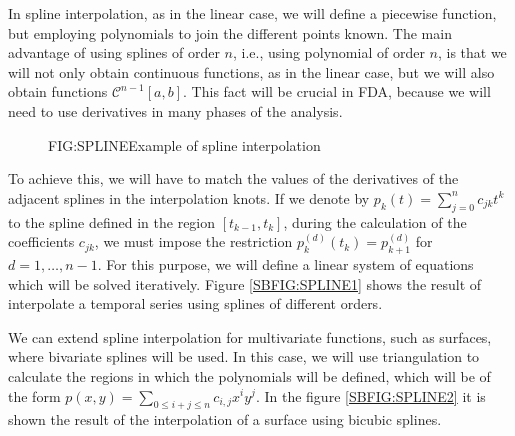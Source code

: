 
In spline interpolation, as in the linear case, we will define a piecewise
function, but employing polynomials to join the different points known.
The main advantage of using splines of order $n$, i.e., using polynomial of
order $n$, is that we will not only obtain continuous functions, as in the
linear case, but we will also obtain functions $\mathcal{C}^{n-1}[a,b]$.
This fact will be crucial in FDA, because we will need to use derivatives in
many phases of the analysis.

\begin{figure}[Example of spline interpolation]{FIG:SPLINE}{Example of spline interpolation}
	 \quad
\end{figure}

To achieve this, we will have to match the values of the derivatives of the
adjacent splines in the interpolation knots. If we denote by
$p_k(t)=\sum_{j=0}^n c_{jk} t^k$ to the spline defined in the region
$[t_{k-1}, t_{k}]$, during the calculation of the coefficients $c_{jk}$, we must
impose the restriction $p_{k}^{(d)}(t_k) = p_{k+1}^{(d)}$ for $d=1, \dots, n-1$.
For this purpose, we will define a linear system of equations which will be
solved iteratively. Figure \ref{SBFIG:SPLINE1} shows the result of interpolate a
temporal series using splines of different orders.

We can extend spline interpolation for multivariate functions, such as surfaces,
where bivariate splines will be used. In this case, we will use triangulation
to calculate the regions in which the polynomials will be defined, which will
be of the form $p(x, y) = \sum_{0 \le i + j \le n} c_{i,j}x^i y^j$.
In the figure \ref{SBFIG:SPLINE2} it is shown the result of the
interpolation of a surface using bicubic splines.

